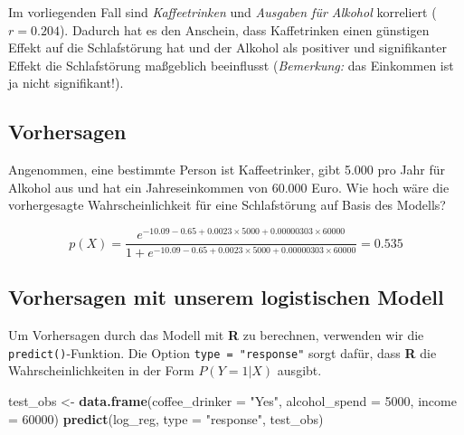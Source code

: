\documentclass[
]{article}
\newenvironment{Shaded}{\begin{snugshade}}{\end{snugshade}}
\newcommand{\AttributeTok}[1]{\textcolor[rgb]{0.13,0.29,0.53}{#1}}
\newcommand{\DecValTok}[1]{\textcolor[rgb]{0.00,0.00,0.81}{#1}}
\newcommand{\FunctionTok}[1]{\textcolor[rgb]{0.13,0.29,0.53}{\textbf{#1}}}
\newcommand{\NormalTok}[1]{#1}
\newcommand{\OtherTok}[1]{\textcolor[rgb]{0.56,0.35,0.01}{#1}}
\newcommand{\SpecialCharTok}[1]{\textcolor[rgb]{0.81,0.36,0.00}{\textbf{#1}}}
\newcommand{\StringTok}[1]{\textcolor[rgb]{0.31,0.60,0.02}{#1}}
\begin{document}
\begin{Shaded}
\end{Shaded}

Im vorliegenden Fall sind \emph{Kaffeetrinken} und \emph{Ausgaben für Alkohol} korreliert (\(r = 0.204\)). Dadurch hat es den Anschein, dass Kaffetrinken einen günstigen Effekt auf die Schlafstörung hat und der Alkohol als positiver und signifikanter Effekt die Schlafstörung maßgeblich beeinflusst (\emph{Bemerkung:} das Einkommen ist ja nicht signifikant!).

\subsection{Vorhersagen}\label{vorhersagen}

Angenommen, eine bestimmte Person ist Kaffeetrinker, gibt 5.000 pro Jahr für Alkohol aus und hat ein Jahreseinkommen von 60.000 Euro. Wie hoch wäre die vorhergesagte Wahrscheinlichkeit für eine Schlafstörung auf Basis des Modells?

\[
p(X) = \frac{e^{-10.09 - 0.65 + 0.0023 \times 5000 + 0.00000303 \times 60000}}{1 + e^{-10.09 - 0.65 + 0.0023 \times 5000 + 0.00000303 \times 60000}} = 0.535
\]

\subsection{Vorhersagen mit unserem logistischen Modell}\label{vorhersagen-mit-unserem-logistischen-modell}

Um Vorhersagen durch das Modell mit \textbf{R} zu berechnen, verwenden wir die \texttt{predict()}-Funktion. Die Option \texttt{type\ =\ "response"} sorgt dafür, dass \textbf{R} die Wahrscheinlichkeiten in der Form \(P(Y=1|X)\) ausgibt.

\begin{Shaded}
\begin{Highlighting}[]
\NormalTok{  test\_obs }\OtherTok{\textless{}{-}} \FunctionTok{data.frame}\NormalTok{(}\AttributeTok{coffee\_drinker =} \StringTok{"Yes"}\NormalTok{,}
                          \AttributeTok{alcohol\_spend =} \DecValTok{5000}\NormalTok{,}
                                 \AttributeTok{income =} \DecValTok{60000}\NormalTok{)}
  \FunctionTok{predict}\NormalTok{(log\_reg, }\AttributeTok{type =} \StringTok{"response"}\NormalTok{, test\_obs)}
\end{Highlighting}
\end{Shaded}
\end{document}
